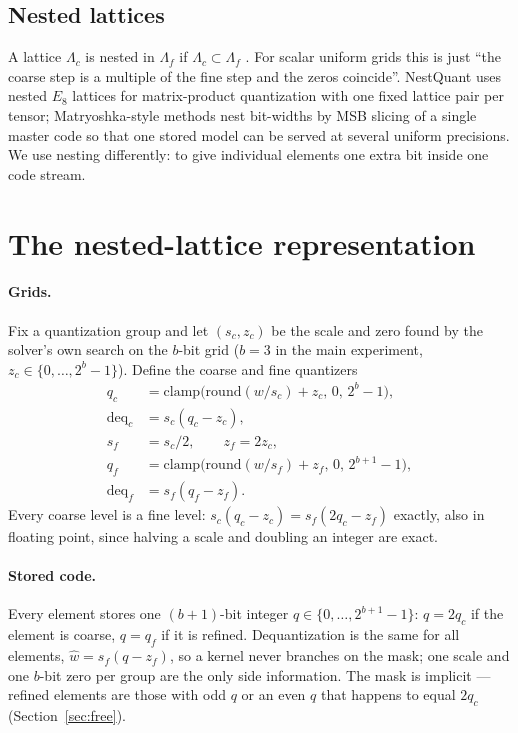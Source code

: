 \documentclass{article}
\begin{document}
\subsection{Nested lattices}

A lattice $\Lambda_c$ is nested in $\Lambda_f$ if $\Lambda_c \subset
\Lambda_f$ \citep{conway1982lattice}. For scalar uniform grids this is
just ``the coarse step is a multiple of the fine step and the zeros
coincide''. NestQuant \citep{savkin2025nestquant} uses nested $E_8$
lattices for matrix-product quantization with one fixed lattice pair per
tensor; Matryoshka-style methods
\citep{nair2025matquant,kleinegger2026matgptq,park2024anyprecision} nest
bit-widths by MSB slicing of a single master code so that one stored model
can be served at several uniform precisions. We use nesting differently:
to give individual elements one extra bit inside one code stream.

\section{The nested-lattice representation}
\label{sec:representation}

\paragraph{Grids.} Fix a quantization group and let $(s_c, z_c)$ be the
scale and zero found by the solver's own search on the $b$-bit grid ($b =
3$ in the main experiment, $z_c \in \{0,\dots,2^b-1\}$). Define the
coarse and fine quantizers
\begin{equation}
\begin{aligned}
  q_c &= \mathrm{clamp}\big(\mathrm{round}(w/s_c) + z_c,\, 0,\, 2^b{-}1\big),\\
  \mathrm{deq}_c &= s_c(q_c - z_c),\\
  s_f &= s_c/2,\qquad z_f = 2z_c,\\
  q_f &= \mathrm{clamp}\big(\mathrm{round}(w/s_f) + z_f,\, 0,\, 2^{b+1}{-}1\big),\\
  \mathrm{deq}_f &= s_f(q_f - z_f).
\end{aligned}
\label{eq:grids}
\end{equation}
Every coarse level is a fine level: $s_c(q_c - z_c) = s_f(2q_c - z_f)$
exactly, also in floating point, since halving a scale and doubling an
integer are exact.

\paragraph{Stored code.} Every element stores one $(b{+}1)$-bit integer
$q \in \{0,\dots,2^{b+1}-1\}$: $q = 2q_c$ if the element is coarse, $q =
q_f$ if it is refined. Dequantization is the same for all elements, $\hat
w = s_f(q - z_f)$, so a kernel never branches on the mask; one scale and
one $b$-bit zero per group are the only side information. The mask is
implicit --- refined elements are those with odd $q$ or an even $q$ that
happens to equal $2q_c$ (Section~\ref{sec:free}).
\end{document}
